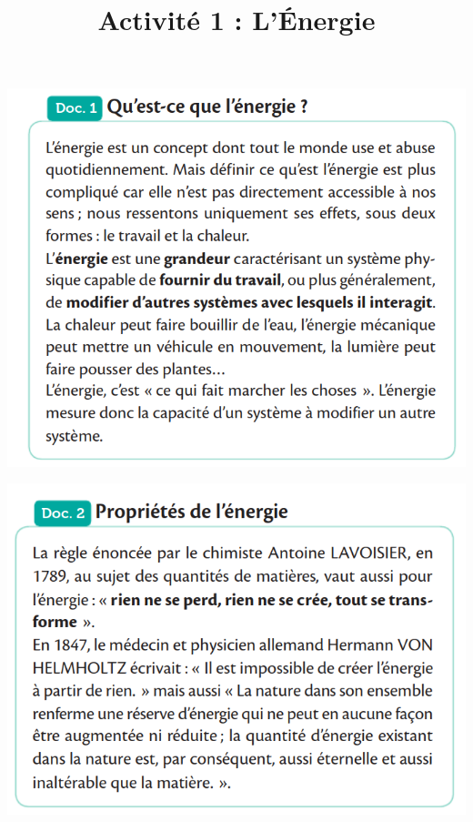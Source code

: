 \documentclass[10pt]{article}
\newcommand{\titreActivite}{Activité 1 : L'Énergie} %
\begin{document}
\date{}
\title{\titreActivite}
\maketitle %



\begin{minipage}[c]{0.45\textwidth}
	\centering
	\includegraphics[scale=0.38]{assets/doc1.png}
\end{minipage}
\hspace{0.1\textwidth}
\begin{minipage}[c]{0.45\textwidth}
	\centering
	\includegraphics[scale=0.38]{assets/doc2.png}
\end{minipage}
\end{document}
